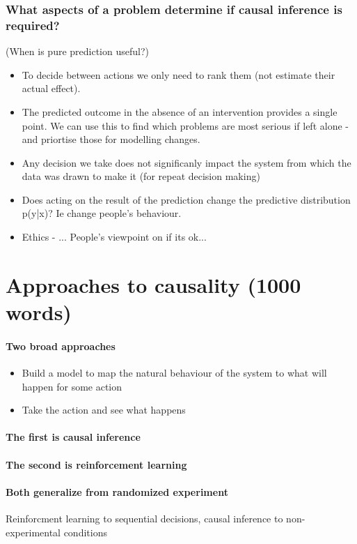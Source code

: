 \documentclass[11pt,a4paper,oneside]{book}
\begin{document}
\subsubsection*{What aspects of a problem determine if causal inference is required?}
(When is pure prediction useful?)
\begin{itemize}
\item To decide between actions we only need to rank them (not estimate their actual effect). 
\item The predicted outcome in the absence of an intervention provides a single point. We can use this to find which problems are most serious if left alone - and priortise those for modelling changes. 
\item Any decision we take does not significanly impact the system from which the data was drawn to make it (for repeat decision making)
\item Does acting on the result of the prediction change the predictive distribution p(y|x)? Ie change people's behaviour.
\item Ethics - ... People's viewpoint on if its ok...

\end{itemize}


\section*{Approaches to causality (1000 words)}

\paragraph*{Two broad approaches} 
\begin{itemize}
\item Build a model to map the natural behaviour of the system to what will happen for some action
\item Take the action and see what happens
\end{itemize}

\paragraph*{The first is causal inference}

\paragraph*{The second is reinforcement learning}

\paragraph*{Both generalize from randomized experiment} Reinforcment learning to sequential decisions, causal inference to non-experimental conditions
\end{document}
